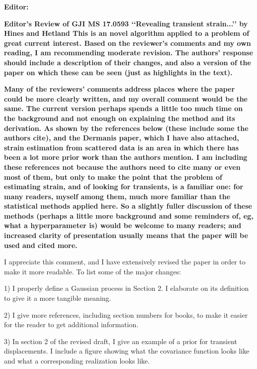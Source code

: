 \documentclass[10pt,a4paper]{letter}
\begin{document}
\begin{letter}{}

\textbf{Editor:}\newline

\textbf{Editor’s Review of GJI MS 17.0593 ‘‘Revealing transient
strain...’’ by Hines and Hetland This is an novel algorithm applied to
a problem of great current interest. Based on the reviewer’s comments
and my own reading, I am recommending moderate revision. The authors’
response should include a description of their changes, and also a
version of the paper on which these can be seen (just as highlights in
the text).}

\textbf{Many of the reviewers’ comments address places where the paper
could be more clearly written, and my overall comment would be the
same. The current version perhaps spends a little too much time on the
background and not enough on explaining the method and its derivation.
As shown by the references below (these include some the authors
cite), and the Dermanis paper, which I have also attached, strain
estimation from scattered data is an area in which there has been a
lot more prior work than the authors mention. I am including these
references not because the authors need to cite many or even most of
them, but only to make the point that the problem of estimating
strain, and of looking for transients, is a familiar one: for many
readers, myself among them, much more familiar than the statistical
methods applied here. So a slightly fuller discussion of these methods
(perhaps a little more background and some reminders of, eg, what a
hyperparameter is) would be welcome to many readers; and increased
clarity of presentation usually means that the paper will be used
and cited more.}

I appreciate this comment, and I have extensively revised the paper in
order to make it more readable. To list some of the major changes:

  1) I properly define a Gaussian process in Section 2. I elaborate on
     its definition to give it a more tangible meaning.

  2) I give more references, including section numbers for books, to
     make it easier for the reader to get additional information.
   
  3) In section 2 of the revised draft, I give an example of a prior
     for transient displacements. I include a figure showing what the
     covariance function looks like and what a corresponding
     realization looks like.
  

\end{letter}
\end{document}
